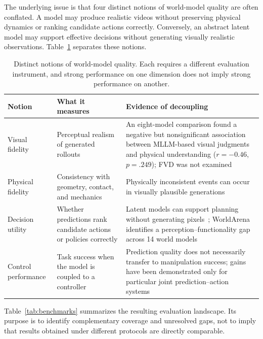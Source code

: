 \documentclass{ieeeaccess}
\begin{document}
The underlying issue is that four distinct notions of world-model quality are often conflated. A model may produce realistic videos without preserving physical dynamics or ranking candidate actions correctly. Conversely, an abstract latent model may support effective decisions without generating visually realistic observations. Table~\ref{tab:fournotions} separates these notions.

\begin{table}[!t]
\caption{Distinct notions of world-model quality. Each requires a different evaluation instrument, and strong performance on one dimension does not imply strong performance on another.}
\label{tab:fournotions}
\centering
\scriptsize
\setlength{\tabcolsep}{3pt}
\begin{tabular}{p{1.5cm}p{2.8cm}p{2.9cm}}
\toprule
Notion & What it measures & Evidence of decoupling \\
\midrule
Visual fidelity &
Perceptual realism of generated rollouts &
An eight-model comparison found a negative but nonsignificant association between MLLM-based visual judgments and physical understanding ($r=-0.46$, $p=.249$); FVD was not examined~\cite{physicsiq} \\
\addlinespace[2pt]

Physical fidelity &
Consistency with geometry, contact, and mechanics &
Physically inconsistent events can occur in visually plausible generations~\cite{wmbench} \\
\addlinespace[2pt]

Decision utility &
Whether predictions rank candidate actions or policies correctly &
Latent models can support planning without generating pixels~\cite{vjepa2}; WorldArena identifies a perception--functionality gap across 14 world models~\cite{worldarena} \\
\addlinespace[2pt]

Control performance &
Task success when the model is coupled to a controller &
Prediction quality does not necessarily transfer to manipulation success; gains have been demonstrated only for particular joint prediction--action systems~\cite{worldvla,cosmospolicy} \\
\bottomrule
\end{tabular}
\end{table}

Table~\ref{tab:benchmarks} summarizes the resulting evaluation landscape. Its purpose is to identify complementary coverage and unresolved gaps, not to imply that results obtained under different protocols are directly comparable.
\end{document}
